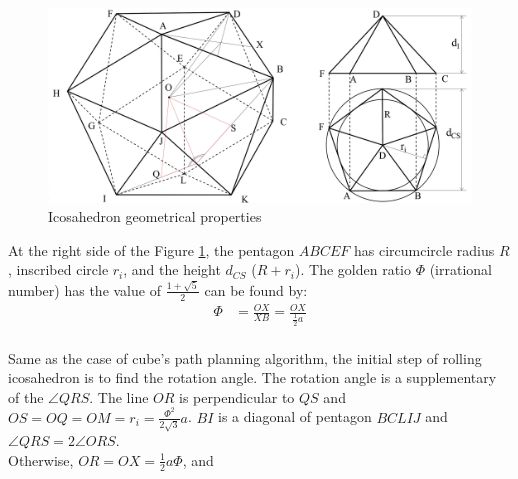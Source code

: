 \begin{figure}[h]
\centering
	\includegraphics[width=\textwidth]{image/icosaGeo22.png}
%	
	\caption{Icosahedron geometrical properties}
	\label{fig:icosaGeo2}
\end{figure}

\noindent At the right side of  the Figure \ref{fig:icosaGeo2}, the pentagon $ABCEF$ has circumcircle radius $R$, inscribed circle $r_i$, and the height $d_{CS}$ ($R+r_i$).
The golden ratio $\Phi$ (irrational number) has the value of $\frac{1+\sqrt{5}}{2}$ can be found by:
\begin{equation*} 
\label{icosa:eq1}
\begin{split}
\Phi & = \frac{OX}{XB} = \frac{OX}{\frac{1}{2}a}\\
\end{split}
\end{equation*}


\noindent Same as the case of cube's path planning algorithm, the initial step of rolling icosahedron is to find the rotation angle. 
The rotation angle is a supplementary of the $\angle{QRS}$. 
The line $OR$ is perpendicular to $QS$ and $OS = OQ = OM = r_i = \frac{\Phi^2}{2\sqrt{3}}a$. 
$BI$ is a diagonal of pentagon $BCLIJ$ and $\angle{QRS}=2\angle{ORS}$.\\

\noindent Otherwise, $OR=OX=\frac{1}{2}a\Phi$, and

